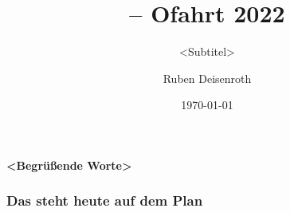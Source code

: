 \documentclass[
    ngerman,
    accentcolor=3b,
    dark_mode,
    fontsize= 12pt,
    a4paper,
    aspectratio=169,
    colorback=true,
    fancy_row_colors,
    leqno,
    fleqn,
    boxarc=3pt,
    fleqn,
    main,
    ]{algoslides}
\subtitle{<Subtitel>}
\author{Ruben Deisenroth}
\title[\shortworkshoptitle{}]{\workshoptitle{} -- Ofahrt 2022}
\date{\today}
\begin{document}

    \maketitle{}

    \begin{frame}[c]
        \centering\huge\textbf{<Begrüßende Worte>}
    \end{frame}

    
    \begin{frame}
        \frametitle{Das steht heute auf dem Plan}
        \tableofcontents[subsubsectionstyle=hide]
    \end{frame}



    
\end{document}
